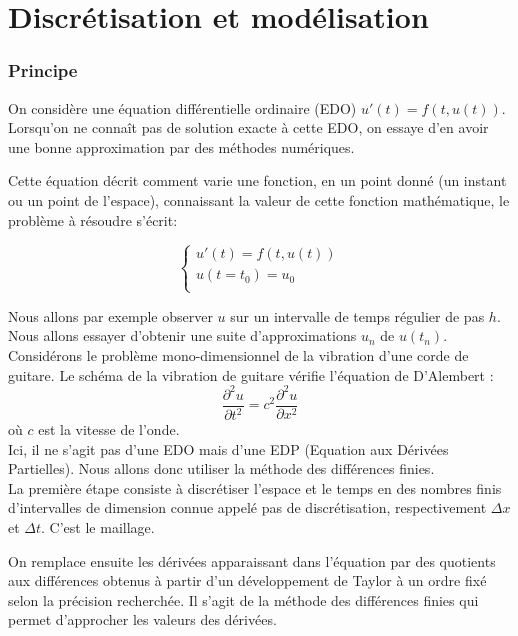 \part{Discrétisation et modélisation}

\section{Principe}

On  considère  une  équation  différentielle  ordinaire  (EDO) $u'(t)=f(t,u(t))$. Lorsqu'on ne  connaît pas de solution exacte à cette EDO, on essaye d'en avoir une bonne approximation par  des méthodes numériques.

Cette équation décrit comment varie une fonction, en un point donné (un instant ou un point de l'espace), connaissant la valeur de cette fonction mathématique, le problème à résoudre s'écrit:

\begin{equation*}
\left \{
\begin{array}{rcl}
u'(t)=f(t,u(t))\\
u(t=t_0) = u_0 \\
\end{array}
\right.
\end{equation*}

Nous  allons par  exemple  observer  $u$  sur un intervalle de  temps
régulier de pas $h$. Nous  allons  essayer  d'obtenir  une suite  d'approximations  $u_n$  de
$u(t_n)$.\\

Considérons le problème mono-dimensionnel de la vibration d'une corde de guitare. Le schéma de la vibration de guitare vérifie l'équation de D'Alembert :
\begin{equation*}
\frac{\partial^2u}{\partial t^2} = c^{2}\frac{\partial^2u}{\partial x^2}
\end{equation*}
où $c$ est la vitesse de l'onde.\\

Ici, il ne s'agit pas d'une EDO mais d'une EDP (Equation aux Dérivées Partielles). Nous allons donc utiliser la méthode des différences finies.\\

La première étape consiste à discrétiser l'espace et le temps en des nombres finis d'intervalles de dimension connue appelé pas de discrétisation, respectivement $\Delta x$ et $\Delta t$. C'est le maillage.

On remplace ensuite les dérivées apparaissant dans l'équation par des quotients aux différences obtenus à partir d'un développement de Taylor à un ordre fixé selon la précision recherchée. Il s'agit de la méthode des différences finies qui permet d'approcher les valeurs des dérivées.\\

